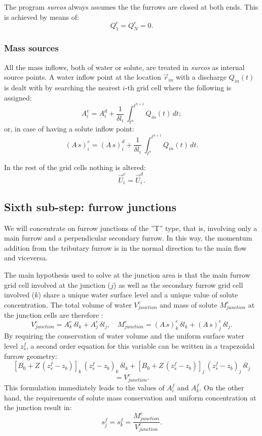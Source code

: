 \documentclass[review,authoryear]{elsarticle}
\newcommand{\eq}[2]{\begin{equation}\label{#2}#1\end{equation}}
\newcommand{\PA}[1] {\left(#1\right)}
\newcommand{\C}[1] {\left[#1\right]}
\begin{document}
The program \emph{surcos} always assumes the the furrows are closed at both
ends. This is achieved by means of:
\eq{Q_1^e=Q_N^e=0.}{EqInletOutlet}

\subsubsection{Mass sources}

All the mass inflows, both of water or solute, are treated in \emph{surcos} as
internal source points. A water inflow point at the location $\vec{r}_{in}$ with
a discharge $Q_{in}(t)$ is dealt with by searching the nearest $i$-th grid cell
where the following is assigned: 
\eq{A_i^e=A_i^d+\frac1{\delta l_i}\,\int_{t^n}^{t^{n+1}}Q_{in}(t)\,dt;}
{EqWaterInput}
or, in case of having a solute inflow point:
\eq
{(A\,s)_i^e=(A\,s)_i^d+\frac1{\delta l_i}\,\int_{t^n}^{t^{n+1}}Q_{in}(t)\,dt.}
{EqSoluteInput}

In the rest of the grid cells nothing is altered:
\eq{\vec{U}_i^e=\vec{U}_i^d.}{EqBoundaryPoint}

\subsection{Sixth sub-step: furrow junctions}

We will concentrate on furrow junctions of the ''T'' type, that is, involving
only a main furrow and a perpendicular secondary furrow. In this way, the
momentum addition from the tributary furrow is in the normal direction to the
main flow and viceversa.

The main hypothesis used to solve at the junction area is that the main
furrow grid cell involved at the junction ($j$) as well as the secondary furrow
grid cell involved ($k$) share a unique water surface level and a unique value
of solute concentration. The total volume of water $V_{junction}^e$ and mass of
solute $M_{junction}^e$ at the junction cells are therefore \citep{JaviSurcos1}:
\eq
{
	V_{junction}^e=A_k^e\,\delta l_k+A_j^e\,\delta l_j,\quad
	M_{junction}^e=(A\,s)_k^e\,\delta l_k+(A\,s)_j^e\,\delta l_j.
}{EqConfluenceMass}
By requiring the conservation of water volume and the uniform surface water
level $z_s^f$, a second order equation for this variable can be written in
a trapezoidal furrow geometry:
\[
	\C{B_0+Z\,\PA{z_s^f-z_b}}_k\,\PA{z_s^f-z_b}_k\,\delta l_k
	+\C{B_0+Z\,\PA{z_s^f-z_b}}_j\,\PA{z_s^f-z_b}_j\,\delta l_j
\]
\eq{=V_{junction}^e.}
{EqConfluencesWater}
This formulation immediately leads to the values of $A_i^f$ and $A_k^f$. On the
other hand, the requirements of solute mass conservation and uniform
concentration at the junction result in:
\eq{s_j^f=s_k^f=\frac{M_{junction}^e}{V_{junction}^e}.}{EqConfluencesSolute}
\end{document}
